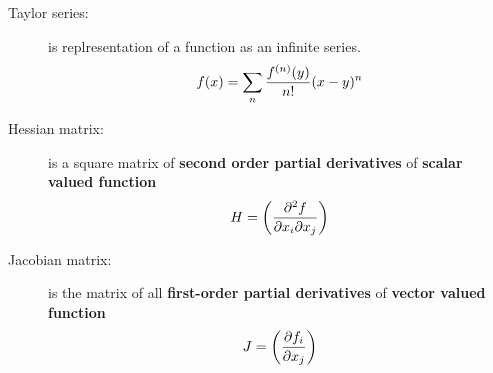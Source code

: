 \begin{slide}[Basics]
	\begin{description}
		\item[Taylor series:] is replresentation of a function as an infinite series.
			$$f(x) = \sum _n {f^{(n)}(y) \over n!} (x-y)^n$$
		\item[Hessian matrix:] is a  square matrix of \textbf{second order partial derivatives} of \textbf{scalar valued function} 
			$$H = \left({\partial^2f \over \partial x_i \partial x_j}\right)$$
		\item[Jacobian matrix:] is the matrix of all \textbf{first-order partial derivatives} of  \textbf{vector valued function}
			$$J = \left({\partial f_i \over \partial x_j}\right)$$
	\end{description}
\end{slide}
